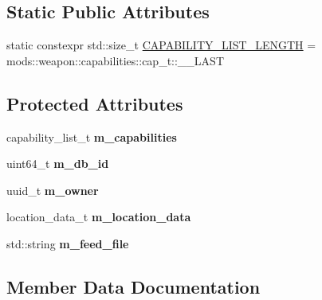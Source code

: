 \subsection*{Static Public Attributes}
\begin{DoxyCompactItemize}
\item 
static constexpr std\+::size\+\_\+t \hyperlink{structobj__data_a8cefe6b9b7e5e568f4cf758e60db2ce2}{C\+A\+P\+A\+B\+I\+L\+I\+T\+Y\+\_\+\+L\+I\+S\+T\+\_\+\+L\+E\+N\+G\+TH} = mods\+::weapon\+::capabilities\+::cap\+\_\+t\+::\+\_\+\+\_\+\+L\+A\+ST
\end{DoxyCompactItemize}
\subsection*{Protected Attributes}
\begin{DoxyCompactItemize}
\item 
\mbox{\label{structobj__data_a95155d445f14001970bb4ce7e60869af}} 
capability\+\_\+list\+\_\+t {\bfseries m\+\_\+capabilities}
\item 
\mbox{\label{structobj__data_a7634842111e8347a45b32e3b50c15b69}} 
uint64\+\_\+t {\bfseries m\+\_\+db\+\_\+id}
\item 
\mbox{\label{structobj__data_ae5a50ebf9852ccb48b962c2718b9279f}} 
uuid\+\_\+t {\bfseries m\+\_\+owner}
\item 
\mbox{\label{structobj__data_af0a28c8761b3a97489e120c29d650590}} 
location\+\_\+data\+\_\+t {\bfseries m\+\_\+location\+\_\+data}
\item 
\mbox{\label{structobj__data_a2e71f438fe78fceae35df4b51b132b49}} 
std\+::string {\bfseries m\+\_\+feed\+\_\+file}
\end{DoxyCompactItemize}


\subsection{Member Data Documentation}
\mbox{\label{structobj__data_a2e18adda623112bbd517ebb765aa8110}} 
